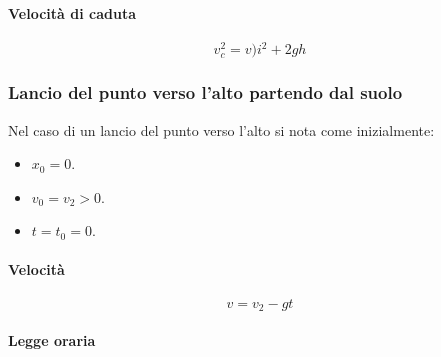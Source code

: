 			\paragraph{Velocit\`a di caduta}
			$$v_c^2=v)i^2+2gh$$

		\subsubsection{Lancio del punto verso l'alto partendo dal suolo}
		Nel caso di un lancio del punto verso l'alto si nota come inizialmente:
		\begin{multicols}{3}
			\begin{itemize}
				\item $x_0=0$.
				\item $v_0 = v_2 > 0$.
				\item $t=t_0=0$.
			\end{itemize}
		\end{multicols}

			\paragraph{Velocit\`a}
			$$v=v_2 - gt$$

			\paragraph{Legge oraria}












